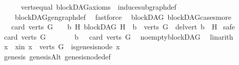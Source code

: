 \begin{isabellebody}
\ \ \ \ \isamarkupfalse%
\ verts{\isacharunderscore}{\kern0pt}equal\ blockDAG{\isacharunderscore}{\kern0pt}axioms\ \ induce{\isacharunderscore}{\kern0pt}subgraph{\isacharunderscore}{\kern0pt}def\isanewline
\ \ \ \ blockDAG{\isachardot}{\kern0pt}gen{\isacharunderscore}{\kern0pt}graph{\isacharunderscore}{\kern0pt}def\ \isamarkupfalse%
\ fastforce\isanewline
{}\isamarkupfalse%
%
\endisatagproof
{\isafoldproof}%
%
\isadelimproof
\isanewline
%
\endisadelimproof
\isanewline
{}\isamarkupfalse%
\ {\isacharparenleft}{\kern0pt}\ blockDAG{\isacharparenright}{\kern0pt}\ blockDAG{\isacharunderscore}{\kern0pt}cases{\isacharunderscore}{\kern0pt}more{\isacharcolon}{\kern0pt}\isanewline
\ \ \ {\isachardoublequoteopen}card\ {\isacharparenleft}{\kern0pt}verts\ G{\isacharparenright}{\kern0pt}\ {\isachargreater}{\kern0pt}\ {}\ {\isasymlongleftrightarrow}\ {\isacharparenleft}{\kern0pt}{\isasymexists}b\ H{\isachardot}{\kern0pt}\ {\isacharparenleft}{\kern0pt}blockDAG\ H\ {\isasymand}\ b\ {\isasymin}\ verts\ G\ {\isasymand}\ del{\isacharunderscore}{\kern0pt}vert\ b\ {\isacharequal}{\kern0pt}\ H{\isacharparenright}{\kern0pt}{\isacharparenright}{\kern0pt}{\isachardoublequoteclose}\isanewline
%
\isadelimproof
%
\endisadelimproof
%
\isatagproof
{}\isamarkupfalse%
\ safe\isanewline
\ \ \isamarkupfalse%
\ {\isachardoublequoteopen}card\ {\isacharparenleft}{\kern0pt}verts\ G{\isacharparenright}{\kern0pt}\ {\isachargreater}{\kern0pt}\ {}{\isachardoublequoteclose}\isanewline
\ \ \isamarkupfalse%
\ \isamarkupfalse%
\ b{}{\isacharcolon}{\kern0pt}\ {\isachardoublequoteopen}{}\ {\isacharless}{\kern0pt}\ card\ {\isacharparenleft}{\kern0pt}verts\ G{\isacharparenright}{\kern0pt}{\isachardoublequoteclose}\ \isamarkupfalse%
\ no{\isacharunderscore}{\kern0pt}empty{\isacharunderscore}{\kern0pt}blockDAG\ \isamarkupfalse%
\ linarith\isanewline
\ \ \isamarkupfalse%
\ x\ \ x{\isacharunderscore}{\kern0pt}in{\isacharcolon}{\kern0pt}\ {\isachardoublequoteopen}x\ {\isasymin}\ {\isacharparenleft}{\kern0pt}verts\ G{\isacharparenright}{\kern0pt}\ {\isasymand}\ is{\isacharunderscore}{\kern0pt}genesis{\isacharunderscore}{\kern0pt}node\ x{\isachardoublequoteclose}\ \isanewline
\ \ \ \ \isamarkupfalse%
\ genesis\ genesisAlt\ genesis{\isacharunderscore}{\kern0pt}node{\isacharunderscore}{\kern0pt}def\ \ \isamarkupfalse%

\end{isabellebody}
